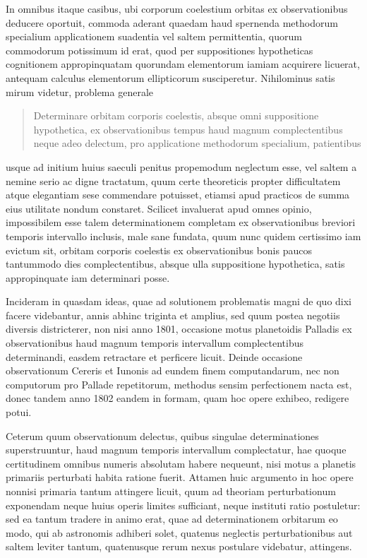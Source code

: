 \documentclass[12pt,a4paper]{book}
\begin{document}
In omnibus itaque casibus, ubi corporum coelestium orbitas ex observationibus deducere oportuit, commoda aderant quaedam haud spernenda methodorum specialium applicationem suadentia vel saltem permittentia, quorum commodorum potissimum id erat, quod per suppositiones hypotheticas cognitionem appropinquatam quorundam elementorum iamiam acquirere licuerat, antequam calculus elementorum ellipticorum susciperetur. Nihilominus satis mirum videtur, problema generale
\begin{quote}
Determinare orbitam corporis coelestis, absque omni suppositione hypothetica, ex observationibus tempus haud magnum complectentibus neque adeo delectum, pro applicatione methodorum specialium, patientibus
\end{quote}
usque ad initium huius saeculi penitus propemodum neglectum esse, vel saltem a nemine serio ac digne tractatum, quum certe theoreticis propter difficultatem atque elegantiam sese commendare potuisset, etiamsi apud practicos de summa eius utilitate nondum constaret. Scilicet invaluerat apud omnes opinio, impossibilem esse talem determinationem completam ex observationibus breviori temporis intervallo inclusis, male sane fundata, quum nunc quidem certissimo iam evictum sit, orbitam corporis coelestis ex observationibus bonis paucos tantummodo dies complectentibus, absque ulla suppositione hypothetica, satis appropinquate iam determinari posse.

Incideram in quasdam ideas, quae ad solutionem problematis magni de quo dixi facere videbantur, annis abhinc triginta et amplius, sed quum postea negotiis diversis districterer, non nisi anno 1801, occasione motus planetoidis Palladis ex observationibus haud magnum temporis intervallum complectentibus determinandi, easdem retractare et perficere licuit. Deinde occasione observationum Cereris et Iunonis ad eundem finem computandarum, nec non computorum pro Pallade repetitorum, methodus sensim perfectionem nacta est, donec tandem anno 1802 eandem in formam, quam hoc opere exhibeo, redigere potui.

Ceterum quum observationum delectus, quibus singulae determinationes superstruuntur, haud magnum temporis intervallum complectatur, hae quoque certitudinem omnibus numeris absolutam habere nequeunt, nisi motus a planetis primariis perturbati habita ratione fuerit. Attamen huic argumento in hoc opere nonnisi primaria tantum attingere licuit, quum ad theoriam perturbationum exponendam neque huius operis limites sufficiant, neque instituti ratio postuletur: sed ea tantum tradere in animo erat, quae ad determinationem orbitarum eo modo, qui ab astronomis adhiberi solet, quatenus neglectis perturbationibus aut saltem leviter tantum, quatenusque rerum nexus postulare videbatur, attingens.
\end{document}
